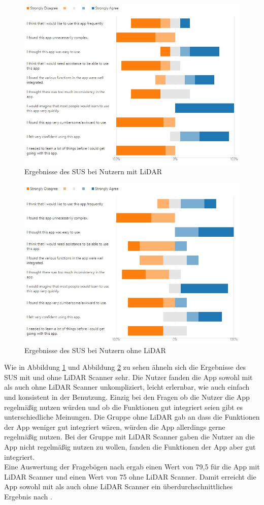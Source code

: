 \documentclass[titlepage, a4paper, 11pt]{scrartcl}
\begin{document}
  \begin{figure}[h]
  \centering
  \includegraphics[width=.6\textwidth]{SUS_LiDAR}
  \caption{Ergebnisse des SUS bei Nutzern mit LiDAR}
  \label{SUS_L}
  \end{figure}

  \begin{figure}[h!]
  \centering
  \includegraphics[width=.6\textwidth]{SUS_No_LiDAR}
  \caption{Ergebnisse des SUS bei Nutzern ohne LiDAR}
  \label{SUS_NL}
  \end{figure}

  Wie in Abbildung \ref{SUS_L} und Abbildung \ref{SUS_NL} zu sehen ähneln sich die Ergebnisse des SUS mit und ohne LiDAR Scanner sehr. Die Nutzer fanden die App sowohl mit als auch ohne LiDAR Scanner unkompliziert, leicht erlernbar, wie auch einfach und konsistent in der Benutzung. Einzig bei den Fragen ob die Nutzer die App regelmäßig nutzen würden und ob die Funktionen gut integriert seien gibt es unterschiedliche Meinungen. Die Gruppe ohne LiDAR gab an dass die Funktionen der App weniger gut integriert wären, würden die App allerdings gerne regelmäßig nutzen. Bei der Gruppe mit LiDAR Scanner gaben die Nutzer an die App nicht regelmäßig nutzen zu wollen, fanden die Funktionen der App aber gut integriert.\\

  Eine Auswertung der Fragebögen nach \cite{SUS_Score} ergab einen Wert von 79,5 für die App mit LiDAR Scanner und einen Wert von 75 ohne LiDAR Scanner. Damit erreicht die App sowohl mit als auch ohne LiDAR Scanner ein überdurchschnittliches Ergebnis nach \cite{SUS_Score}.\\
\end{document}
